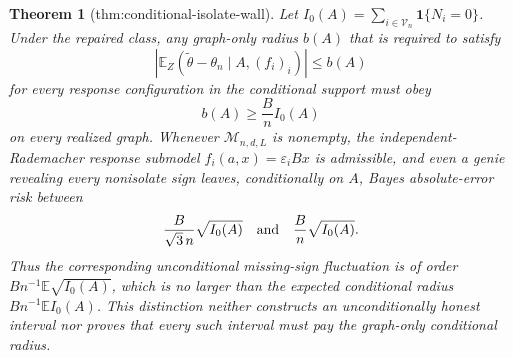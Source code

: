 \documentclass{article}
\newtheorem{theorem}{Theorem}
\begin{document}
\begin{theorem}[thm:conditional-isolate-wall]\label{thm:conditional-isolate-wall}
Let \(I_0(A)=\sum_{i\in\mathcal V_n}\mathbf1\{N_i=0\}\).  Under the repaired class, any graph-only radius \(b(A)\) that is required to satisfy
\[
 \left|\mathbb E_Z(\widetilde\theta-\theta_n\mid A,(f_i)_i)\right|\leq b(A)
\]
for every response configuration in the conditional support must obey
\[
 b(A)\geq \frac{B}{n}I_0(A)
\]
on every realized graph.  Whenever \(\mathcal M_{n,d,L}\) is nonempty, the independent-Rademacher response submodel \(f_i(a,x)=\varepsilon_iBx\) is admissible, and even a genie revealing every nonisolate sign leaves, conditionally on \(A\), Bayes absolute-error risk between
\[
 \frac{B}{\sqrt3\,n}\sqrt{I_0(A)}
 \quad\hbox{and}\quad
 \frac{B}{n}\sqrt{I_0(A)}.
\]
Thus the corresponding unconditional missing-sign fluctuation is of order \(Bn^{-1}\mathbb E\sqrt{I_0(A)}\), which is no larger than the expected conditional radius \(Bn^{-1}\mathbb E I_0(A)\).  This distinction neither constructs an unconditionally honest interval nor proves that every such interval must pay the graph-only conditional radius.
\end{theorem}
\end{document}

